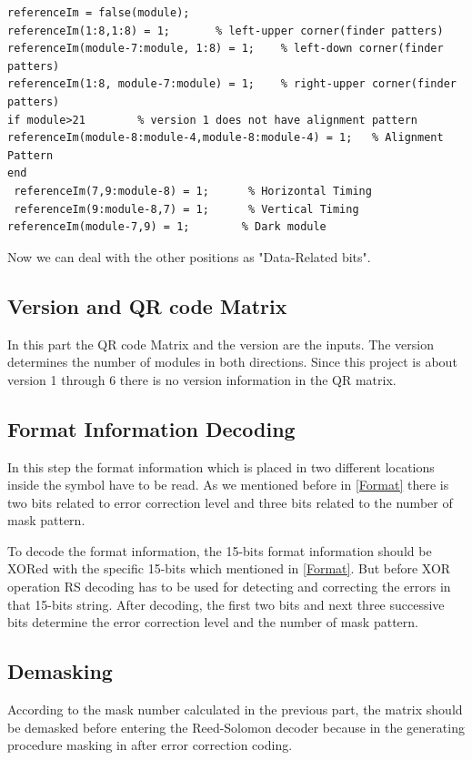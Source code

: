 \begin{lstlisting}
referenceIm = false(module);
referenceIm(1:8,1:8) = 1;       % left-upper corner(finder patters)
referenceIm(module-7:module, 1:8) = 1;    % left-down corner(finder patters)
referenceIm(1:8, module-7:module) = 1;    % right-upper corner(finder patters)
if module>21        % version 1 does not have alignment pattern
referenceIm(module-8:module-4,module-8:module-4) = 1;   % Alignment Pattern
end
 referenceIm(7,9:module-8) = 1;      % Horizontal Timing
 referenceIm(9:module-8,7) = 1;      % Vertical Timing
referenceIm(module-7,9) = 1;        % Dark module
\end{lstlisting}

Now we can deal with the other positions as "Data-Related bits".


\subsection{Version and QR code Matrix}

In this part the QR code Matrix and the version are the inputs. The version determines the number of modules in both directions. Since this project is about version 1 through 6 there is no version information in the QR matrix.

\subsection{Format Information Decoding}

In this step the format information which is placed in two
different locations inside the symbol have to be read. As we mentioned before in \ref{Format} there is two bits related to error correction level and three bits related to the number of mask pattern.

To decode the format information, the 15-bits format information should be XORed with the specific 15-bits which mentioned in \ref{Format}. But before XOR operation RS decoding has to be used for detecting and correcting the errors in that 15-bits string. After decoding, the first two bits and next three successive bits determine the error correction level and the number of mask pattern.

\subsection{Demasking}

According to the mask number calculated in the previous part, the matrix should be demasked before entering the Reed-Solomon decoder because in the generating procedure masking in after error correction coding.

